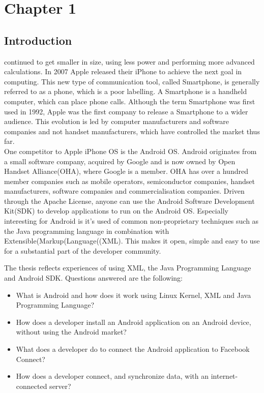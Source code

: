 \chapter*{Chapter 1}
\section{Introduction}
continued to get smaller in	size, using	less power and performing more advanced calculations.	In 2007	Apple released their iPhone	to achieve the	next goal in computing. This new type of communication tool, called Smartphone, is	generally referred to as a phone, which is a poor labelling. A Smartphone is a handheld computer, which	can place phone	calls. Although	the	term Smartphone	was	first used in 1992, Apple was	the	first company to release a Smartphone to a wider audience. This evolution is led by computer manufacturers and software companies and not handset manufacturers, which have controlled the market thus far.\\

\noindent
One competitor to Apple iPhone OS is the Android OS. Android originates from a small software company, acquired by Google and is now owned by Open Handset Alliance(OHA), where Google is a member. OHA has over a hundred member companies such as mobile operators, semiconductor companies, handset manufacturers, software companies and commercialisation companies. Driven through the Apache License, anyone can use the Android Software Development Kit(SDK) to develop applications to run on the Android OS. Especially interesting for Android is it's used of common non-proprietary techniques such as the Java programming language in combination with Extensible(Markup(Language((XML). This makes it open, simple and easy to use for a substantial part of the developer community.

\noindent
The thesis reflects experiences of using XML, the Java Programming Language and Android SDK. Questions answered are the following:
\begin{itemize}
\item {What is Android and how does it work using Linux Kernel, XML and Java Programming Language? }
\item {How does a developer install an Android application on an Android device, without using the Android market? }
\item {What does a developer do to connect the Android application to Facebook Connect? }
\item {How does a developer connect, and synchronize data, with an internet-connected server? }
\end{itemize}

